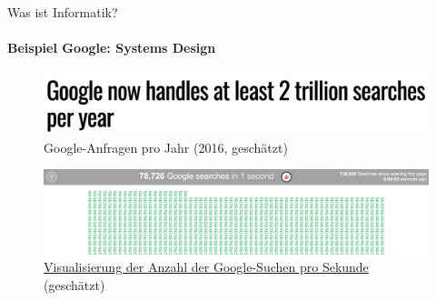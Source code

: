     
    \begin{frame}[fragile]{Was ist Informatik?}
        \framesubtitle{Beispiel Google: Systems Design}
        \begin{figure}
            \centering
            \includegraphics[width=\linewidth,height=0.3\textheight,keepaspectratio]{chapters/02_computer_science/figures/google/sys_des/searches.png}
            \caption{
                Google-Anfragen pro Jahr (2016, geschätzt) 
                \cite{google:sys_des:searches}
            }
        \end{figure}
        
        \begin{figure}
            \centering
            \includegraphics[width=\linewidth,height=0.3\textheight,keepaspectratio]{chapters/02_computer_science/figures/google/sys_des/searches2.png}
            \caption{
                \href{https://www.internetlivestats.com/one-second/#google-band}{Visualisierung der Anzahl der Google-Suchen pro Sekunde} (geschätzt)
            }
        \end{figure}
    
    \end{frame}
    
